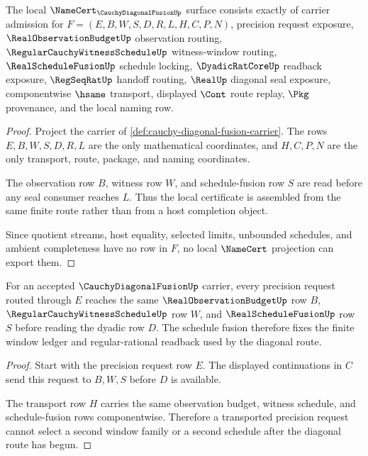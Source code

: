 \begin{theorem}
\label{thm:cauchy-diagonal-fusion-namecert-obligations}
The local $\NameCert_{\CauchyDiagonalFusionUp}$ surface consists exactly of carrier admission for $F=(E,B,W,S,D,R,L,H,C,P,N)$, precision request exposure, $\RealObservationBudgetUp$ observation routing, $\RegularCauchyWitnessScheduleUp$ witness-window routing, $\RealScheduleFusionUp$ schedule locking, $\DyadicRatCoreUp$ readback exposure, $\RegSeqRatUp$ handoff routing, $\RealUp$ diagonal seal exposure, componentwise $\hsame$ transport, displayed $\Cont$ route replay, $\Pkg$ provenance, and the local naming row.
\end{theorem}
\begin{proof}
Project the carrier of \autoref{def:cauchy-diagonal-fusion-carrier}. The rows $E,B,W,S,D,R,L$ are the only mathematical coordinates, and $H,C,P,N$ are the only transport, route, package, and naming coordinates.

The observation row $B$, witness row $W$, and schedule-fusion row $S$ are read before any seal consumer reaches $L$. Thus the local certificate is assembled from the same finite route rather than from a host completion object.

Since quotient streams, host equality, selected limits, unbounded schedules, and ambient completeness have no row in $F$, no local $\NameCert$ projection can export them.
\end{proof}

\begin{theorem}
\label{thm:cauchy-diagonal-fusion-schedule-lock}
For an accepted $\CauchyDiagonalFusionUp$ carrier, every precision request routed through $E$ reaches the same $\RealObservationBudgetUp$ row $B$, $\RegularCauchyWitnessScheduleUp$ row $W$, and $\RealScheduleFusionUp$ row $S$ before reading the dyadic row $D$. The schedule fusion therefore fixes the finite window ledger and regular-rational readback used by the diagonal route.
\end{theorem}
\begin{proof}
Start with the precision request row $E$. The displayed continuations in $C$ send this request to $B,W,S$ before $D$ is available.

The transport row $H$ carries the same observation budget, witness schedule, and schedule-fusion rows componentwise. Therefore a transported precision request cannot select a second window family or a second schedule after the diagonal route has begun.
\end{proof}

